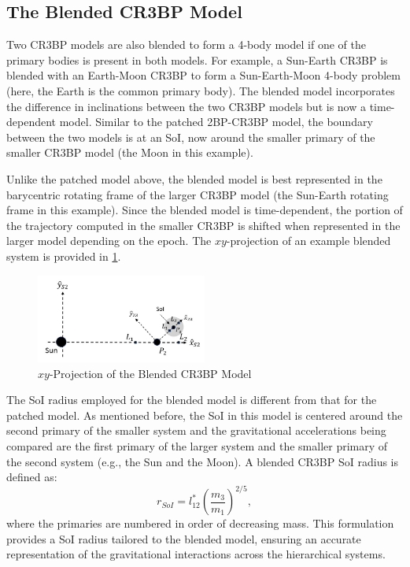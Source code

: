 \subsection{The Blended CR3BP Model}
Two CR3BP models are also blended to form a 4-body model if one of the primary bodies is present in
both models. For example, a Sun-Earth CR3BP is blended with an Earth-Moon CR3BP to form a
Sun-Earth-Moon 4-body problem (here, the Earth is the common primary body). The blended model
incorporates the difference in inclinations between the two CR3BP models but is now a
time-dependent model\cite{Kakoi:2014}. Similar to the patched 2BP-CR3BP model, the boundary between
the two models is at an SoI, now around the smaller primary of the smaller CR3BP model (the Moon in
this example).

Unlike the patched model above, the blended model is best represented in the barycentric rotating
frame of the larger CR3BP model (the Sun-Earth rotating frame in this example). Since the blended
model is time-dependent, the portion of the trajectory computed in the smaller CR3BP is shifted
when represented in the larger model depending on the epoch. The $xy$-projection of an example
blended system is provided in \cref{fig:BlendedCR3BP}.

\begin{figure}[H]
    \centering
    \includegraphics[width=0.5\textwidth]{figures/BlendCR3BP.jpg}
    \caption{$xy$-Projection of the Blended CR3BP Model}
    \label{fig:BlendedCR3BP}
\end{figure}

The SoI radius employed for the blended model is different from that for the patched model. As
mentioned before, the SoI in this model is centered around the second primary of the smaller system
and the gravitational accelerations being compared are the first primary of the larger system and
the smaller primary of the second system (e.g., the Sun and the Moon). A blended CR3BP SoI radius
is defined as:
\begin{equation}
    r_{SoI}=l^{*}_{12}(\frac{m_{3}}{m_{1}})^{2/5},
    \label{eq:blendedSoI}
\end{equation}
where the primaries are numbered in order of decreasing mass\cite{Parker:2013}. This formulation
provides a SoI radius tailored to the blended model, ensuring an accurate representation of the
gravitational interactions across the hierarchical systems.
